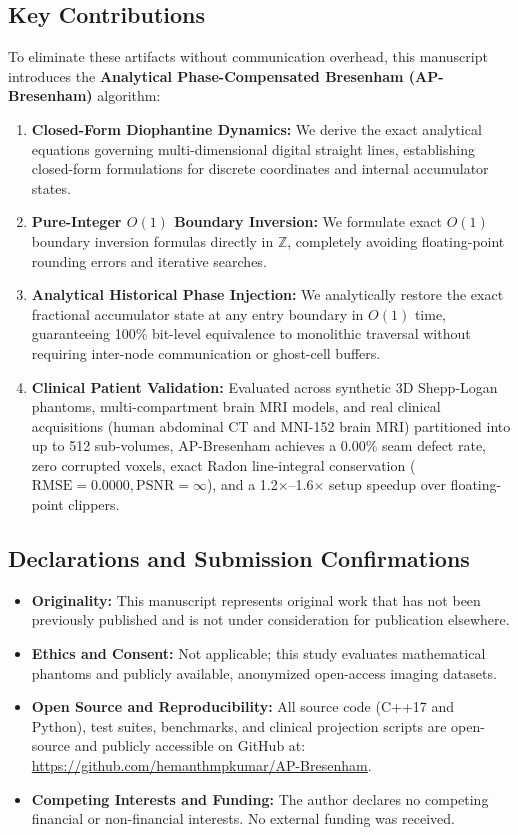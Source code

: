 \documentclass[11pt]{article}
\begin{document}
\subsection*{Key Contributions}
To eliminate these artifacts without communication overhead, this manuscript introduces the \textbf{Analytical Phase-Compensated Bresenham (AP-Bresenham)} algorithm:
\begin{enumerate}
    \item \textbf{Closed-Form Diophantine Dynamics:} We derive the exact analytical equations governing multi-dimensional digital straight lines, establishing closed-form formulations for discrete coordinates and internal accumulator states.
    \item \textbf{Pure-Integer $O(1)$ Boundary Inversion:} We formulate exact $O(1)$ boundary inversion formulas directly in $\mathbb{Z}$, completely avoiding floating-point rounding errors and iterative searches.
    \item \textbf{Analytical Historical Phase Injection:} We analytically restore the exact fractional accumulator state at any entry boundary in $O(1)$ time, guaranteeing 100\% bit-level equivalence to monolithic traversal without requiring inter-node communication or ghost-cell buffers.
    \item \textbf{Clinical Patient Validation:} Evaluated across synthetic 3D Shepp-Logan phantoms, multi-compartment brain MRI models, and real clinical acquisitions (human abdominal CT and MNI-152 brain MRI) partitioned into up to 512 sub-volumes, AP-Bresenham achieves a 0.00\% seam defect rate, zero corrupted voxels, exact Radon line-integral conservation ($\mathrm{RMSE} = 0.0000, \mathrm{PSNR} = \infty$), and a 1.2$\times$--1.6$\times$ setup speedup over floating-point clippers.
\end{enumerate}

\subsection*{Declarations and Submission Confirmations}
\begin{itemize}
    \item \textbf{Originality:} This manuscript represents original work that has not been previously published and is not under consideration for publication elsewhere.
    \item \textbf{Ethics and Consent:} Not applicable; this study evaluates mathematical phantoms and publicly available, anonymized open-access imaging datasets.
    \item \textbf{Open Source and Reproducibility:} All source code (C++17 and Python), test suites, benchmarks, and clinical projection scripts are open-source and publicly accessible on GitHub at: \url{https://github.com/hemanthmpkumar/AP-Bresenham}.
    \item \textbf{Competing Interests and Funding:} The author declares no competing financial or non-financial interests. No external funding was received.
\end{itemize}
\end{document}
